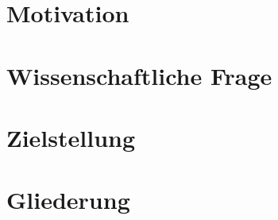 

\section{Motivation}
\label{sec:Motivation}

\section{Wissenschaftliche Frage}
\label{sec:WissenschaftlicheFrage}

\section{Zielstellung}
\label{sec:Zielstellung}

\section{Gliederung}
\label{sec:Gliederung}

